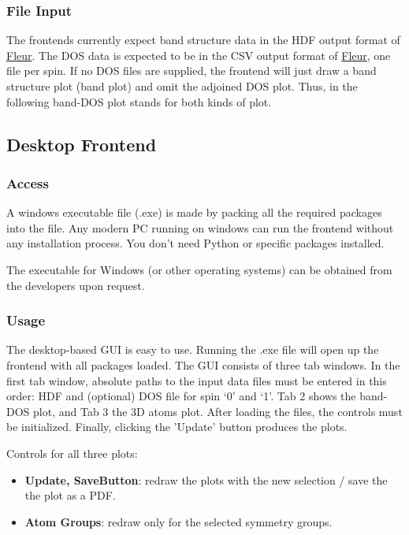 \subsubsection{File Input}\label{file-input}

The frontends currently expect band structure data in the HDF output format of
\href{http://www.judft.de}{Fleur}. The DOS data is expected
to be in the CSV output format of \href{http://www.judft.de}{Fleur}, one file
per spin. If no DOS files are supplied, the frontend will just draw a band
structure plot (band plot) and omit the adjoined DOS plot. Thus, in the
following band-DOS plot stands for both kinds of plot.

\subsection{Desktop Frontend}\label{desktop-frontend}

\subsubsection{Access}\label{access}

A windows executable file (.exe) is made by packing all the required packages
into the file. Any modern PC running on windows can run the frontend without any
installation process. You don't need Python or specific packages installed.

The executable for Windows (or other operating systems) can be obtained from the developers upon request.

\subsubsection{Usage}\label{usage}

The desktop-based GUI is easy to use. Running the .exe file will open up the
frontend with all packages loaded. The GUI consists of three tab windows. In the
first tab window, absolute paths to the input data files must be entered in this
order: HDF and (optional) DOS file for spin `0' and `1'. Tab 2 shows the
band-DOS plot, and Tab 3 the 3D atoms plot. After loading the files, the controls
must be initialized. Finally, clicking the 'Update' button produces the plots.


Controls for all three plots: 

\begin{itemize}\tightlist
\item \textbf{Update, SaveButton}: redraw the plots with the new selection / save the the plot as a PDF.
\item \textbf{Atom Groups}: redraw only for the selected symmetry groups.
\end{itemize}

